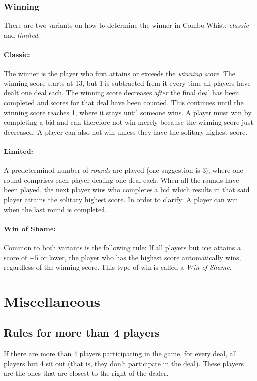 \documentclass[a4paper]{article}
\begin{document}
			\subsubsection{Winning}
				\label{sec:winning}
				There are two variants on how to determine the winner in Combo Whist: \emph{classic} and \emph{limited}.

				\paragraph{Classic:}
				The winner is the player who first attains or exceeds the \emph{winning score}. The winning score starts at 13, but 1 is subtracted from it every time all players have dealt one deal each. The winning score decreases \emph{after} the final deal has been completed and scores for that deal have been counted. This continues until the winning score reaches 1, where it stays until someone wins. A player must win by completing a bid and can therefore not win merely because the winning score just decreased. A player can also not win unless they have the solitary highest score.

				\paragraph{Limited:}
				A predetermined number of \emph{rounds} are played (one suggestion is 3), where one round comprises each player dealing one deal each. When all the rounds have been played, the next player wins who completes a bid which results in that said player attains the solitary highest score. In order to clarify: A player can win when the last round is completed.

				\paragraph{Win of Shame:}
				Common to both variants is the following rule: If all players but one attains a score of $-5$ or lower, the player who has the highest score automatically wins, regardless of the winning score. This type of win is called a \emph{Win of Shame}.

	\section{Miscellaneous}
		\subsection{Rules for more than 4 players}
			If there are more than 4 players participating in the game, for every deal, all players but 4 sit out (that is, they don't participate in the deal). These players are the ones that are closest to the right of the dealer.
		
\end{document}
